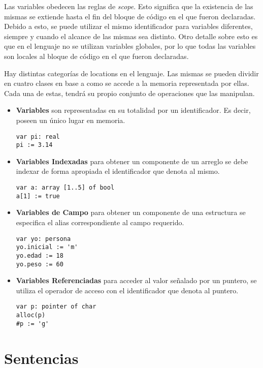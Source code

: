\documentclass{article}
\begin{document}
Las variables obedecen las reglas de \textit{scope}.
Esto significa que la existencia de las mismas se extiende hasta el fin del bloque de código en el que fueron declaradas.
Debido a esto, se puede utilizar el mismo identificador para variables diferentes, siempre y cuando el alcance de las mismas sea distinto.
Otro detalle sobre esto es que en el lenguaje no se utilizan variables globales, por lo que todas las variables son locales al bloque de código en el que fueron declaradas.

Hay distintas categorías de locations en el lenguaje.
Las mismas se pueden dividir en cuatro clases en base a como se accede a la memoria representada por ellas.
Cada una de estas, tendrá su propio conjunto de operaciones que las manipulan.

\begin{itemize}

\item
\textbf{Variables} son representadas en su totalidad por un identificador. Es decir, poseen un único lugar en memoria.
\begin{lstlisting}
var pi: real
pi := 3.14
\end{lstlisting}

\item
\textbf{Variables Indexadas} para obtener un componente de un arreglo se debe indexar de forma apropiada el identificador que denota al mismo.
\begin{lstlisting}
var a: array [1..5] of bool
a[1] := true
\end{lstlisting}

\item
\textbf{Variables de Campo} para obtener un componente de una estructura se especifica el alias correspondiente al campo requerido.
\begin{lstlisting}
var yo: persona
yo.inicial := 'm'
yo.edad := 18
yo.peso := 60
\end{lstlisting}

\item
\textbf{Variables Referenciadas} para acceder al valor señalado por un puntero, se utiliza el operador de acceso con el identificador que denota al puntero.
\begin{lstlisting}
var p: pointer of char
alloc(p)
#p := 'g'
\end{lstlisting}

\end{itemize}

\section{Sentencias}
\end{document}
